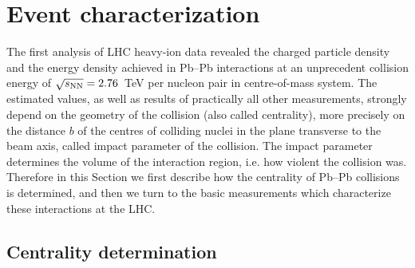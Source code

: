 \section{Event characterization}
\label{secks:eventchar}

The first analysis of LHC heavy-ion data revealed the charged particle density and the energy density achieved in Pb--Pb interactions at an unprecedent collision energy of $\sqrt{s_{\rm NN}} = 2.76$~TeV per nucleon pair in centre-of-mass system. The estimated values, as well as results of practically all other measurements, strongly depend on the geometry of the collision (also called centrality), more precisely on the distance $b$ of the centres of colliding nuclei in the plane transverse to the beam axis, called impact parameter of the collision. The impact parameter determines the volume of the interaction region, i.e. how violent the collision was.
Therefore in this Section we first describe how the centrality of Pb--Pb collisions is determined, and then we turn to the basic measurements which characterize these interactions at the LHC.



\subsection{Centrality determination}
\label{subsecks:centrality}


